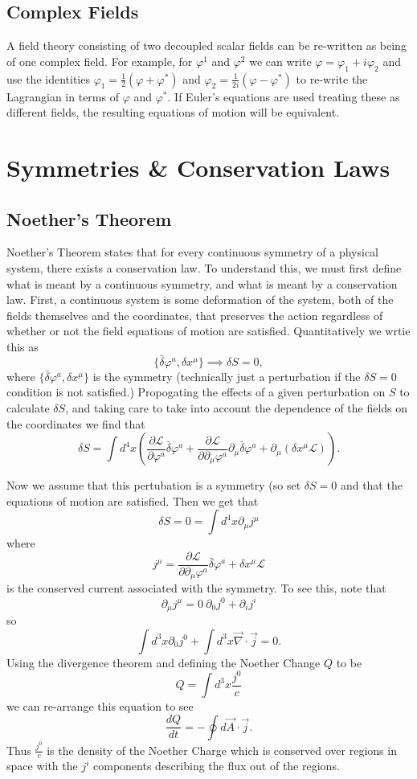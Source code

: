 \documentclass[cm]{article}
\begin{document}
\subsection{Complex Fields}
A field theory consisting of two decoupled scalar fields can be re-written as
being of one complex field.  For example, for $\varphi^1$ and $\varphi^2$ we can
write $\varphi = \varphi_1 + i \varphi_2$ and use the identities $\varphi_1 =
\frac12 (\varphi + \varphi^*)$ and $\varphi_2 = \frac{1}{2i} ( \varphi -
  \varphi^*)$ to re-write the Lagrangian in terms of $\varphi$ and $\varphi^*$.
If Euler's equations are used treating these as different fields, the resulting
equations of motion will be equivalent.
\section{Symmetries \& Conservation Laws}
\subsection{Noether's Theorem}
Noether's Theorem states that for every continuous symmetry of a physical
system, there exists a conservation law. To understand this, we must first
define what is meant by a continuous symmetry, and what is meant by a
conservation law. First, a continuous system is some deformation of the system,
both of the fields themselves and the coordinates, that preserves the action
regardless of whether or not the field equations of motion are satisfied.
Quantitatively we wrtie this as
\[ \{ \bar{\delta}\varphi^a, \delta x^{\mu} \} \implies \delta S = 0 ,\]
where $\{ \bar{\delta}\varphi^a, \delta x^{\mu} \}$ is the symmetry (technically
just a perturbation if the $\delta S = 0$ condition is not satisfied.)
Propogating the effects of a given perturbation on $S$ to calculate $\delta S$,
and taking care to take into account the dependence of the fields on the
coordinates we find that
\[ \delta S = \int d^4x \left( \frac{\partial \mathcal{L}}{\partial \varphi^a}
    \bar{\delta}\varphi^a + \frac{ \partial \mathcal{L}}{\partial \partial_{\mu}
    \varphi^a} \partial_{\mu} \bar{\delta}\varphi^a + \partial_{\mu} (\delta
      x^{\mu} \mathcal{L}) \right).\]

Now we assume that this pertubation is a symmetry (so set $\delta S = 0$ and
that the equations of motion are satisfied. Then we get that
\[ \delta S = 0 = \int d^4x \partial_{\mu} j^{\mu} \]
where
\[ j^{\mu} = \frac{\partial \mathcal{L}}{\partial \partial_{\mu} \varphi^a}
\bar{\delta}\varphi^a + \delta x^{\mu} \mathcal{L} \]
is the conserved current associated with the symmetry. To see this, note that
\[ \partial_\mu j^\mu = 0 \ \partial_0 j^0 + \partial_i j^i \]
so
\[ \int d^3x \partial_0 j^0 + \int d^3 x \vec{\nabla} \cdot \vec{j} = 0.\]
Using the divergence theorem and defining the Noether Change $Q$ to be
\[Q = \int d^3x \frac{j^0}{c}\]
we can re-arrange this equation to see
\[ \frac{dQ}{dt} = - \oint d \vec{A} \cdot \vec{j}.\]
Thus $\frac{j^0}{c}$ is the density of the Noether Charge which is conserved
over regions in space with the $j^i$ components describing the flux out of the
regions.
\end{document}
